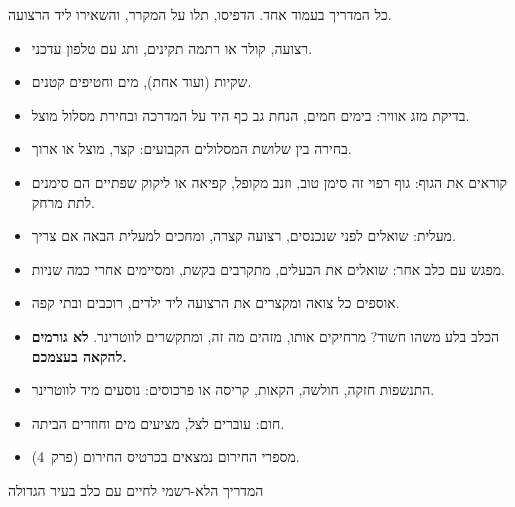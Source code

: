 כל המדריך בעמוד אחד. הדפיסו, תלו על המקרר, והשאירו ליד הרצועה.

\begin{tcbraster}[raster columns=1,raster row skip=14pt,raster before skip=10pt,
  raster every box/.style={fontupper=\large,top=7pt,bottom=7pt,before upper={\setlist[itemize]{itemsep=5pt,label={\color{coral}\textbullet}}}}]
  \begin{tcolorbox}[enhanced,colback=sage!12!white,colframe=sagedark,arc=3mm,boxrule=0.9pt,
     title={\sffamily\bfseries\paw[white]\enspace לפני כל טיול},colbacktitle=sagedark,left=8pt,right=8pt]
    \begin{itemize}
      \item רצועה, קולר או רתמה תקינים, ותג עם טלפון עדכני.
      \item שקיות (ועוד אחת), מים וחטיפים קטנים.
      \item בדיקת מזג אוויר: בימים חמים, הנחת גב כף היד על המדרכה ובחירת מסלול מוצל.
      \item בחירה בין שלושת המסלולים הקבועים: קצר, מוצל או ארוך.
    \end{itemize}
  \end{tcolorbox}
  \begin{tcolorbox}[enhanced,colback=navy!6!white,colframe=navy,arc=3mm,boxrule=0.9pt,
     title={\sffamily\bfseries\infoicon\enspace בדרך},colbacktitle=navy,left=8pt,right=8pt]
    \begin{itemize}
      \item קוראים את הגוף: גוף רפוי זה סימן טוב, וזנב מקופל, קפיאה או ליקוק שפתיים הם סימנים לתת מרחק.
      \item מעלית: שואלים לפני שנכנסים, רצועה קצרה, ומחכים למעלית הבאה אם צריך.
      \item מפגש עם כלב אחר: שואלים את הבעלים, מתקרבים בקשת, ומסיימים אחרי כמה שניות.
      \item אוספים כל צואה ומקצרים את הרצועה ליד ילדים, רוכבים ובתי קפה.
    \end{itemize}
  \end{tcolorbox}
  \begin{tcolorbox}[enhanced,colback=alert!5!white,colframe=alert,arc=3mm,boxrule=1.2pt,
     title={\sffamily\bfseries\medicon\enspace כשמשהו משתבש},colbacktitle=alert,left=8pt,right=8pt]
    \begin{itemize}
      \item הכלב בלע משהו חשוד? מרחיקים אותו, מזהים מה זה, ומתקשרים לווטרינר. \textbf{לא גורמים להקאה בעצמכם.}
      \item התנשפות חזקה, חולשה, הקאות, קריסה או פרכוסים: נוסעים מיד לווטרינר.
      \item חום: עוברים לצל, מציעים מים וחוזרים הביתה.
      \item מספרי החירום נמצאים בכרטיס החירום (פרק~4).
    \end{itemize}
  \end{tcolorbox}
\end{tcbraster}

\vfill
\begin{center}
  {\sffamily\small\color{sagedark}\paw[sage]\enspace המדריך הלא-רשמי לחיים עם כלב בעיר הגדולה\enspace\paw[sage]}
\end{center}
\clearpage
